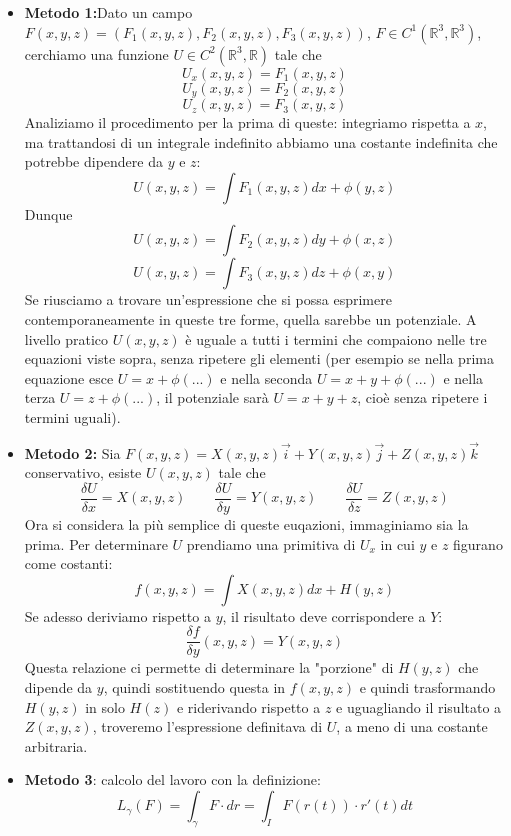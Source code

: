\begin{itemize}
    \item \textbf{Metodo 1:}Dato un campo $F(x,y,z) = (F_1(x,y,z), F_2(x,y,z), F_3(x,y,z))$, $F \in C^1(\mathbb{R}^3, \mathbb{R}^3)$, cerchiamo una funzione $U \in C^2(\mathbb{R}^3, \mathbb{R})$ tale che
    \[
        U_x(x,y,z) = F_1(x,y,z)
    \]
    \[
        U_y(x,y,z) = F_2(x,y,z)
    \]
    \[
        U_z(x,y,z) = F_3(x,y,z)
    \]
    Analiziamo il procedimento per la prima di queste: integriamo rispetta a $x$, ma trattandosi di un integrale indefinito abbiamo una costante indefinita che potrebbe dipendere da $y$ e $z$:
    \[
        U(x,y,z) = \int F_1(x,y,z)dx + \phi(y,z)
    \]
    Dunque
    \[
        U(x,y,z) = \int F_2(x,y,z)dy + \phi(x,z)
    \]
    \[
        U(x,y,z) = \int F_3(x,y,z)dz + \phi(x,y)
    \]
    Se riusciamo a trovare un'espressione che si possa esprimere contemporaneamente in queste tre forme, quella sarebbe un potenziale. A livello pratico $U(x,y,z)$ è uguale a tutti i termini che compaiono nelle tre equazioni viste sopra, senza ripetere gli elementi (per esempio se nella prima equazione esce $U = x + \phi(...)$ e nella seconda $U = x + y + \phi(...)$ e nella terza $U = z + \phi(...)$, il potenziale sarà $U = x +y +z$, cioè senza ripetere i termini uguali).
    \item \textbf{Metodo 2:} Sia $F(x,y,z) = X(x,y,z)\vec{i} + Y(x,y,z)\vec{j} + Z(x,y,z)\vec{k}$ conservativo, esiste $U(x,y,z)$ tale che
    \[
        \frac{\delta U}{\delta x} = X(x,y,z) \quad \quad \frac{\delta U}{\delta y} = Y(x,y,z) \quad \quad \frac{\delta U}{\delta z} = Z(x,y,z)
    \]
    Ora si considera la più semplice di queste euqazioni, immaginiamo sia la prima.\newline
    Per determinare $U$ prendiamo una primitiva di $U_x$ in cui $y$ e $z$ figurano come costanti:
    \[
        f(x,y,z) = \int X(x,y,z)dx + H(y,z)
    \]
    Se adesso deriviamo rispetto a $y$, il risultato deve corrispondere a $Y$:
    \[
        \frac{\delta f}{\delta y}(x,y,z) = Y (x,y,z)
    \]
    Questa relazione ci permette di determinare la "porzione" di $H(y,z)$ che dipende da $y$, quindi sostituendo questa in $f(x,y,z)$ e quindi trasformando $H(y,z)$ in solo $H(z)$ e riderivando rispetto a $z$ e uguagliando il risultato a $Z(x,y,z)$, troveremo l'espressione definitava di $U$, a meno di una costante arbitraria.
    \item \textbf{Metodo 3}: calcolo del lavoro con la definizione:
    \[
        L_\gamma (F) = \int_{\gamma} F \cdot dr = \int_{I} F(r(t))\cdot r'(t) dt
\]
\end{itemize}
